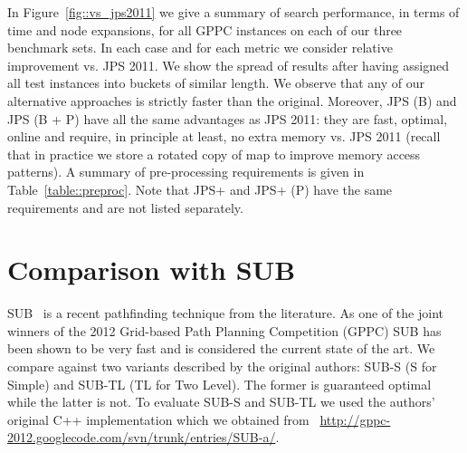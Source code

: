 In Figure~\ref{fig::vs_jps2011} we give a summary of search performance, in terms
of time and node expansions, for all GPPC instances on each of our three benchmark sets. 
In each case and for each metric we consider relative improvement vs. JPS 2011.
We show the spread of results after having assigned all test instances into buckets of 
similar length.
We observe that any of our alternative approaches is strictly faster than the original. 
Moreover, JPS (B) and JPS (B + P) have all the same advantages as JPS 2011: they are 
fast, optimal, online and require, in principle at least, no extra memory vs. JPS 2011
(recall that in practice we store a rotated copy of map to improve memory access
patterns).
A summary of pre-processing requirements is given in Table~\ref{table::preproc}. Note
that JPS+ and JPS+ (P) have the same requirements and are not listed separately.


\section{Comparison with SUB}
SUB~\cite{urasKH13} is a recent pathfinding technique from the literature.
As one of the joint winners of the 2012 Grid-based Path Planning Competition (GPPC) 
SUB has been shown to be very fast and is considered the current state of the art.
We compare against two variants described by the original authors: SUB-S (S
for Simple) and SUB-TL (TL for Two Level). The former is guaranteed optimal
while the latter is not.  To evaluate SUB-S and SUB-TL we used the authors'
original C++ implementation which we obtained from~{\small
\url{http://gppc-2012.googlecode.com/svn/trunk/entries/SUB-a/}}.


